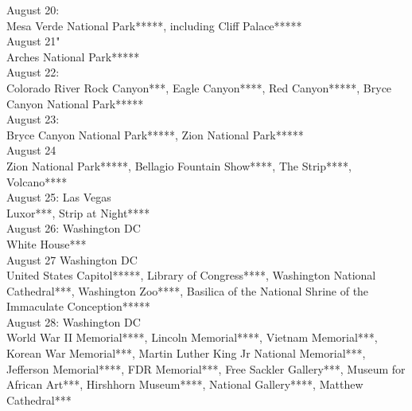 August 20:\\
Mesa Verde National Park*****, including Cliff Palace*****\\

August 21"\\
Arches National Park*****\\

August 22:\\
Colorado River Rock Canyon***, Eagle Canyon****, Red Canyon*****, Bryce Canyon National Park*****\\

August 23:\\
Bryce Canyon National Park*****, Zion National Park*****\\

August 24\\
Zion National Park*****, Bellagio Fountain Show****, The Strip****, Volcano****\\

August 25: Las Vegas\\
Luxor***, Strip at Night****\\

August 26: Washington DC\\
White House***\\

August 27 Washington DC\\
United States Capitol*****,  Library of Congress****, Washington National Cathedral***, Washington Zoo****, Basilica of the National Shrine of the Immaculate Conception*****\\

August 28: Washington DC\\
World War II Memorial****, Lincoln Memorial****, Vietnam Memorial***, Korean War Memorial***, Martin Luther King Jr National Memorial***, Jefferson Memorial****, FDR Memorial***, Free Sackler Gallery***, Museum for African Art***, Hirshhorn Museum****, National Gallery****, Matthew Cathedral***\\

